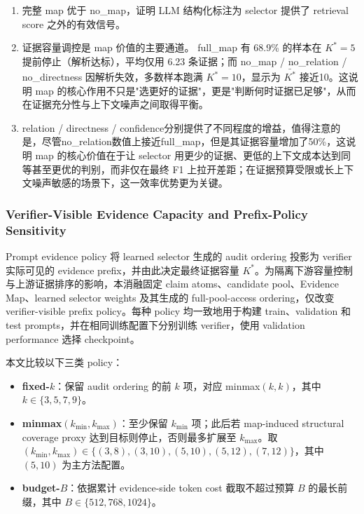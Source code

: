 \documentclass[letterpaper]{article}
\begin{document}
\begin{enumerate}
\item 完整 map 优于 no\_map，证明 LLM 结构化标注为 selector 提供了 retrieval score 之外的有效信号。
\item 证据容量调控是 map 价值的主要通道。 full\_map 有 68.9\% 的样本在 $K^\ast{=}5$ 提前停止（解析达标），平均仅用 6.23 条证据；而 no\_map / no\_relation / no\_directness 因解析失效，多数样本跑满 $K^\ast{=}10$，显示为 $\bar{K^\ast}$ 接近10。这说明 map 的核心作用不只是"选更好的证据"，更是"判断何时证据已足够"，从而在证据充分性与上下文噪声之间取得平衡。
\item relation / directness / confidence分别提供了不同程度的增益，值得注意的是，尽管no\_relation数值上接近full\_map，但是其证据容量增加了50\%，这说明 map 的核心价值在于让 selector 用更少的证据、更低的上下文成本达到同等甚至更优的判别，而非仅在最终 F1 上拉开差距；在证据预算受限或长上下文噪声敏感的场景下，这一效率优势更为关键。
\end{enumerate}

\subsubsection{Verifier-Visible Evidence Capacity and Prefix-Policy Sensitivity}

Prompt evidence policy 将 learned selector 生成的 audit ordering 投影为 verifier 实际可见的 evidence prefix，并由此决定最终证据容量 $K^\ast$。为隔离下游容量控制与上游证据排序的影响，本消融固定 claim atoms、candidate pool、Evidence Map、learned selector weights 及其生成的 full-pool-access ordering，仅改变 verifier-visible prefix policy。每种 policy 均一致地用于构建 train、validation 和 test prompts，并在相同训练配置下分别训练 verifier，使用 validation performance 选择 checkpoint。

本文比较以下三类 policy：

\begin{itemize}
\item \textbf{fixed-$k$}：保留 audit ordering 的前 $k$ 项，对应 minmax$(k,k)$，其中 $k\in\{3,5,7,9\}$。
\item \textbf{minmax$(k_{\min},k_{\max})$}：至少保留 $k_{\min}$ 项；此后若 map-induced structural coverage proxy 达到目标则停止，否则最多扩展至 $k_{\max}$。取 $(k_{\min},k_{\max})\in\{(3,8),(3,10),(5,10),(5,12),(7,12)\}$，其中 $(5,10)$ 为主方法配置。
\item \textbf{budget-$B$}：依据累计 evidence-side token cost 截取不超过预算 $B$ 的最长前缀，其中 $B\in\{512,768,1024\}$。
\end{itemize}
\end{document}
